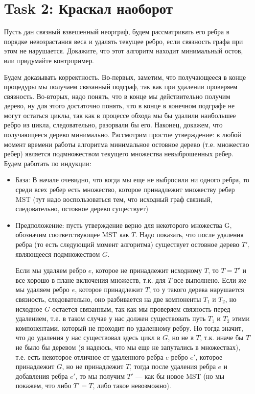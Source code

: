 \section{Task 2: Краскал наоборот}
\begin{task}
    Пусть дан связный взвешенный неорграф, будем рассматривать его ребра в порядке невозрастания веса и удалять текущее ребро, если связность графа при этом не нарушается.
    Докажите, что этот алгоритм находит минимальный остов, или придумайте контрпример.
\end{task}

\begin{solution}
    Будем доказывать корректность.
        Во-первых, заметим, что получающееся в конце процедуры мы получаем связанный подграф, так как при удалении проверяем связность.
        Во-вторых, надо понять, что в конце мы действительно получим дерево, ну для этого достаточно понять, что в конце в конечном подграфе не могут остаться циклы, так как в процессе обхода мы бы удалили наибольшее ребро из цикла, следовательно, разорвали бы его.
        Наконец, докажем, что получающееся дерево минимально.
        Рассмотрим простое утверждение: в любой момент времени работы алгоритма минимальное остовное дерево (т.е. множество ребер) является подмножеством текущего множества невыброшенных ребер.
        Будем работать по индукции:
        \begin{itemize}
            \item База: В начале очевидно, что когда мы еще не выбросили ни одного ребра, то среди всех ребер есть множество, которое принадлежит множеству ребер MST (тут надо воспользоваться тем, что исходный граф связный, следовательно, остовное дерево существует)
            \item Предположение: пусть утверждение верно для некоторого множества G, обозначим соответствующее MST как $T$.
            Надо показать, что после удаления ребра (то есть следующий момент алгоритма) существует остовное дерево $T'$, являющееся подмножеством $G$.
            
            Если мы удаляем ребро $e$, которое не принадлежит исходному $T$, то $T=T'$ и все хорошо в плане включения множеств, т.к. для $T$ все выполнено.
            Если же мы удаляем ребро $e$, которое принадлежит $T$, то у такого дерева нарушается связность, следовательно, оно разбивается на две компоненты $T_1$ и $T_2$, но исходное $G$ остается связанным, так как мы проверяем связность перед удалением, т.е. в таком случае у нас должен существовать путь $T_1$ и $T_2$ этими компонентами, который не проходит по удаленному ребру.
            Но тогда значит, что до удаления у нас существовал здесь цикл в $G$, но не в $T$, т.к. иначе бы $T$ не было бы деревом (я надеюсь, что мы еще не запутались в множествах), т.е. есть некоторое отличное от удаленного ребра $e$ ребро $e'$, которое принадлежит $G$, но не принадлежит $T$, тогда после удаления ребра $e$ и добавления ребра $e'$, то мы получим $T'$ --- как бы новое MST (но мы покажем, что либо $T'=T$, либо такое невозможно).
            

\end{itemize}
\end{solution}
